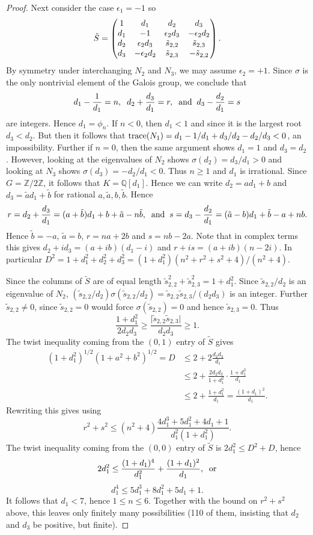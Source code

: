 \documentclass[12pt,psamsfonts]{amsart}
\newcommand{\e}{{\epsilon}}
\newcommand{\Z}{\mathbb Z}
\numberwithin{equation}{section}
\theoremstyle{definition}
\begin{document}
\begin{proof}
Next consider the case $\e_1=-1$ so
$$\tilde S=\left(\begin{matrix} 1 & d_1 & d_2 & d_3\cr d_1 & -1 & \e_2
d_3 & -\e_2 d_2\cr d_2 & \e_2 d_3 & \tilde s_{2,2} & \tilde
s_{2,3}\cr d_3 & -\e_2 d_2 & \tilde s_{2,3} & -\tilde
s_{2,2}\end{matrix} \right).$$ By symmetry under interchanging
$N_2$ and $N_3$, we may assume $\e_2=+1$. Since $\sigma$ is the
only nontrivial element of the Galois group, we conclude that
$$d_1-\frac{1}{d_1}=n,\;\; d_2+\frac{d_3}{d_1}=r,\;\; {\rm and}\;\;
d_3-\frac{d_2}{d_1}=s$$ are integers. Hence $d_1=\phi_n$. If
$n<0$, then $d_1<1$ and since it is the largest root $d_3<d_2$.
But then it follows that ${\rm
trace}(N_1)=d_1-1/d_1+d_3/d_2-d_2/d_3<0$, an impossibility.
Further if $n=0$, then the same argument shows $d_1=1$ and
$d_3=d_2$. However, looking at the eigenvalues of $N_2$ shows
$\sigma(d_2)=d_3/d_1>0$ and looking at $N_3$ shows
$\sigma(d_3)=-d_2/d_1<0$. Thus $n\ge 1$ and $d_1$ is irrational.
Since $G=\Z/2\Z$, it follows that $K={\mathbb Q}[d_1]$. Hence we
can write $d_2=ad_1+b$ and $d_3=\tilde a d_1+\tilde b$ for
rational $a,\tilde a,b,\tilde b$. Hence
$$r=d_2+\frac{d_3}{d_1}=(a+\tilde b) d_1 + b + \tilde a - n \tilde b,\;\;
{\rm and}\;\; s=d_3-\frac{d_2}{d_1}=(\tilde a-b) d_1 +\tilde b - a + n
b.$$ Hence $\tilde b=-a$, $\tilde a=b$, $r=na+2b$ and $s=nb-2a$.
Note that in complex terms this gives $d_2+id_3 = (a+ib)(d_1-i)$
and $r+is=(a+ib)(n-2i)$. In particular
$D^2=1+d_1^2+d_2^2+d_3^2=(1+d_1^2)(n^2+r^2+s^2+4)/(n^2+4)$.

Since the columns of $\tilde S$ are of equal length $\tilde
s_{2,2}^2+\tilde s_{2,3}^2=1+d_1^2$. Since $\tilde s_{2,2}/d_2$ is
an eigenvalue of $N_2$, $(\tilde s_{2,2}/d_2) \sigma(\tilde
s_{2,2}/d_2) =\tilde s_{2,2}\tilde s_{2,3}/(d_2d_3)$ is an
integer. Further $\tilde s_{2,2}\ne 0$, since $\tilde s_{2,2}=0$
would force $\sigma(\tilde s_{2,2})=0$ and hence $\tilde
s_{2,3}=0$. Thus
$$\frac{1+d_1^2}{2d_2d_3}\ge \frac{\vert \tilde s_{2,2}\tilde s_{2,3}\vert}{d_2d_3}\ge 1.$$
The twist inequality coming from the $(0,1)$ entry of $\tilde S$
gives
\begin{equation*}\begin{split}
(1+d_1^2)^{1/2}(1+a^2+b^2)^{1/2}=D & \le 2 + 2\frac{d_2d_3}{d_1}\\
& \le 2 + \frac{2d_2d_3}{1+d_1^2}\cdot \frac{1+d_1^2}{d_1}\\
& \le 2+\frac{1+d_1^2}{d_1} = \frac{(1+d_1)^2}{d_1}.
\end{split}\end{equation*}
Rewriting this gives using
$$r^2+s^2 \le (n^2+4) \frac{4d_1^3+5d_1^2+4d_1+1}{d_1^2(1+d_1^2)}.$$
The twist inequality coming from the $(0,0)$ entry of $\tilde S$
is $2 d_1^2\le D^2 + D$, hence
$$2 d_1^2 \le \frac{(1+d_1)^4}{d_1^2}+\frac{(1+d_1)^2}{d_1},\;\;{\rm or}$$
$$d_1^4\le 5 d_1^3 + 8 d_1^2 + 5 d_1 + 1.$$
It follows that $d_1<7$, hence $1\le n\le 6$. Together with the
bound on $r^2+s^2$ above, this leaves only finitely many
possibilities (110 of them, insisting that $d_2$ and $d_3$ be
positive, but finite).


\end{proof}
\end{document}
